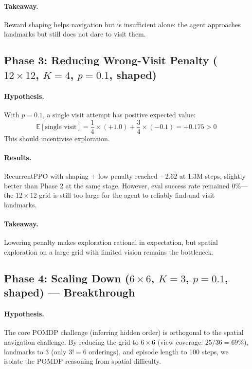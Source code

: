 \documentclass[11pt,a4paper]{article}
\begin{document}
\paragraph{Takeaway.} Reward shaping helps navigation but is insufficient
alone: the agent approaches landmarks but still does not dare to visit them.

\subsection{Phase 3: Reducing Wrong-Visit Penalty ($12\times12$, $K\!=\!4$, $p\!=\!0.1$, shaped)}

\paragraph{Hypothesis.} With $p=0.1$, a single visit attempt has positive
expected value:
\[
  \mathbb{E}[\text{single visit}] = \frac{1}{4} \times (+1.0) + \frac{3}{4} \times (-0.1) = +0.175 > 0
\]
This should incentivise exploration.

\paragraph{Results.} RecurrentPPO with shaping + low penalty reached $-2.62$
at 1.3M steps, slightly better than Phase 2 at the same stage. However,
eval success rate remained 0\%---the $12\times12$ grid is still too large for
the agent to reliably find and visit landmarks.

\paragraph{Takeaway.} Lowering penalty makes exploration rational in
expectation, but spatial exploration on a large grid with limited vision
remains the bottleneck.

\subsection{Phase 4: Scaling Down ($6\times6$, $K\!=\!3$, $p\!=\!0.1$, shaped) --- Breakthrough}

\paragraph{Hypothesis.} The core POMDP challenge (inferring hidden order) is
orthogonal to the spatial navigation challenge. By reducing the grid to
$6\times6$ (view coverage: $25/36 = 69\%$), landmarks to 3 (only $3!=6$
orderings), and episode length to 100 steps, we isolate the POMDP reasoning
from spatial difficulty.
\end{document}
